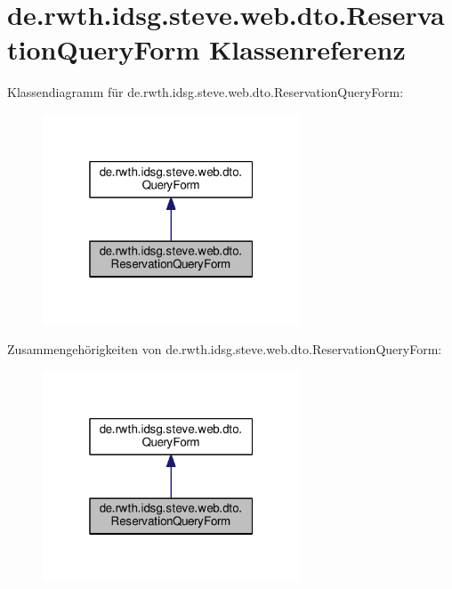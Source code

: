 \hypertarget{classde_1_1rwth_1_1idsg_1_1steve_1_1web_1_1dto_1_1_reservation_query_form}{\section{de.\+rwth.\+idsg.\+steve.\+web.\+dto.\+Reservation\+Query\+Form Klassenreferenz}
\label{classde_1_1rwth_1_1idsg_1_1steve_1_1web_1_1dto_1_1_reservation_query_form}
}


Klassendiagramm für de.\+rwth.\+idsg.\+steve.\+web.\+dto.\+Reservation\+Query\+Form\+:\nopagebreak
\begin{figure}[H]
\begin{center}
\leavevmode
\includegraphics[width=217pt]{classde_1_1rwth_1_1idsg_1_1steve_1_1web_1_1dto_1_1_reservation_query_form__inherit__graph}
\end{center}
\end{figure}


Zusammengehörigkeiten von de.\+rwth.\+idsg.\+steve.\+web.\+dto.\+Reservation\+Query\+Form\+:\nopagebreak
\begin{figure}[H]
\begin{center}
\leavevmode
\includegraphics[width=217pt]{classde_1_1rwth_1_1idsg_1_1steve_1_1web_1_1dto_1_1_reservation_query_form__coll__graph}
\end{center}
\end{figure}
